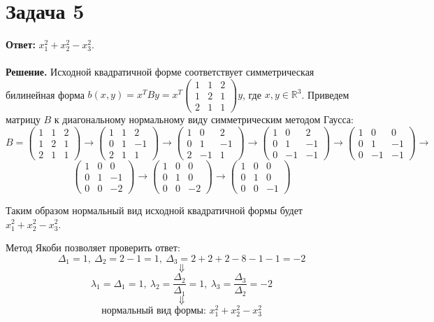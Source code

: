 \documentclass{article}
\begin{document}
\section*{Задача 5}
{\bf Ответ:} $x_1^2+x_2^2-x_3^2$.
\\
\\
{\bf Решение.} Исходной квадратичной форме соответствует симметрическая билинейная форма $b(x,y)=x^TBy=x^T\left(\begin{array}{rrr}1 & 1 & 2\\1 & 2 & 1\\2 & 1 & 1\end{array}\right)y$, где $x,y\in\mathbb{R}^3$. Приведем матрицу $B$ к диагональному нормальному виду симметрическим методом Гаусса:
$$B=\left(\begin{array}{rrr}1 & 1 & 2\\1 & 2 & 1\\2 & 1 & 1\end{array}\right)\rightarrow\left(\begin{array}{rrr}1 & 1 & 2\\0 & 1 & -1\\2 & 1 & 1\end{array}\right)\rightarrow\left(\begin{array}{rrr}1 & 0 & 2\\0 & 1 & -1\\2 & -1 & 1\end{array}\right)\rightarrow\left(\begin{array}{rrr}1 & 0 & 2\\0 & 1 & -1\\0 & -1 & -1\end{array}\right)\rightarrow\left(\begin{array}{rrr}1 & 0 & 0\\0 & 1 & -1\\0 & -1 & -1\end{array}\right)\rightarrow$$
$$\left(\begin{array}{rrr}1 & 0 & 0\\0 & 1 & -1\\0 & 0 & -2\end{array}\right)\rightarrow\left(\begin{array}{rrr}1 & 0 & 0\\0 & 1 & 0\\0 & 0 & -2\end{array}\right)\rightarrow\left(\begin{array}{rrr}1 & 0 & 0\\0 & 1 & 0\\0 & 0 & -1\end{array}\right)$$
\par
Таким образом нормальный вид исходной квадратичной формы будет $x_1^2+x_2^2-x_3^2$.
\par
Метод Якоби позволяет проверить ответ:
$$\Delta_1=1,\ \Delta_2=2-1=1,\ \Delta_3=2+2+2-8-1-1=-2$$
$$\Downarrow$$
$$\lambda_1=\Delta_1=1,\ \lambda_2=\frac{\Delta_2}{\Delta_1}=1,\ \lambda_3=\frac{\Delta_3}{\Delta_2}=-2$$
$$\Downarrow$$
$$\textrm{нормальный вид формы: }x_1^2+x_2^2-x_3^2$$
\end{document}
